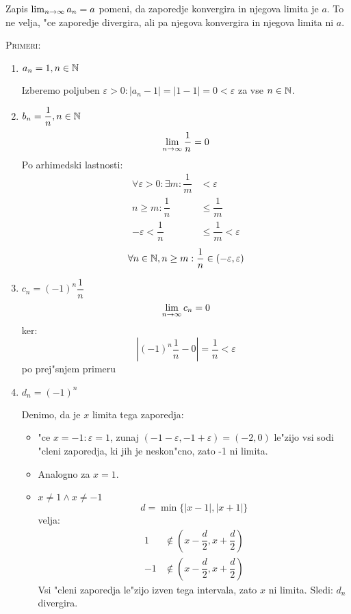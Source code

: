 Zapis $\lim_{n \rightarrow \infty} a_n = a$ pomeni, da zaporedje konvergira in njegova limita je $a$. To ne velja, "ce zaporedje divergira, ali pa njegova konvergira in njegova limita ni $a$.

\textsc{Primeri:}
\begin{enumerate}[1)]
	\item $a_n = 1, n \in \mathbb{N}$
	
	
	Izberemo poljuben $\varepsilon > 0: |a_n - 1| = |1-1| = 0 < \varepsilon$ za vse $n \in \mathbb{N}$.
	
	\item $b_n = \dfrac{1}{n}, n \in \mathbb{N}$
	\begin{equation*}
	\lim_{n \rightarrow \infty} \dfrac{1}{n} = 0
	\end{equation*}
	Po arhimedski lastnosti:
	\begin{align*}
	\forall \varepsilon > 0: \exists m : \dfrac{1}{m} &< \varepsilon\\
	n \geq m: \dfrac{1}{n} &\leq \dfrac{1}{m}\\
	- \varepsilon < \dfrac{1}{n} &\leq \dfrac{1}{m} < \varepsilon
	\end{align*}
	\begin{equation*}
	\forall n \in \mathbb{N}, n \geq m: \dfrac{1}{n} \in (-\varepsilon, \varepsilon)
	\end{equation*}
	
	\item $c_n = (-1)^n \dfrac{1}{n}$
	\begin{equation*}
	\lim_{n \rightarrow \infty} c_n = 0
	\end{equation*}
	ker:
	\begin{equation*}
	\left|(-1)^n \dfrac{1}{n} - 0\right| = \dfrac{1}{n} < \varepsilon
	\end{equation*}
	po prej"snjem primeru
	
	\item $d_n = (-1)^n$
	
	
	Denimo, da je $x$ limita tega zaporedja:
	\begin{itemize}
		\item "ce $x = -1: \varepsilon = 1$, zunaj $(-1 - \varepsilon, -1 + \varepsilon) = (-2, 0)$ le"zijo vsi sodi "cleni zaporedja, ki jih je neskon"cno, zato -1 ni limita.
		
		\item Analogno za $x = 1$.
		
		\item $x \neq 1 \land x \neq -1$
		\begin{equation*}
		d = \min \{|x-1|, |x+1|\}
		\end{equation*}
		velja:
		\begin{align*}
		1 &\notin (x - \dfrac{d}{2}, x + \dfrac{d}{2}) \\
		-1 &\notin (x - \dfrac{d}{2}, x + \dfrac{d}{2})
		\end{align*}
		Vsi "cleni zaporedja le"zijo izven tega intervala, zato $x$ ni limita. Sledi: $d_n$ divergira.
	\end{itemize}
\end{enumerate}

